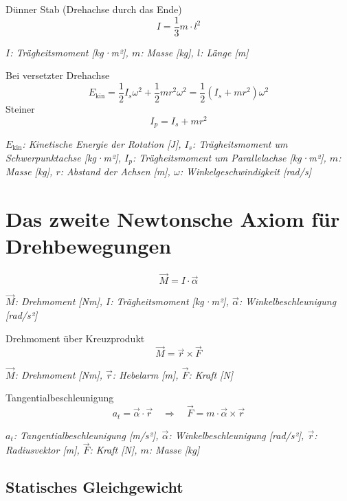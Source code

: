 \documentclass[a4paper,10pt]{article}
\newenvironment{displayformula}
{
	\begin{framed}
		\color{formulaColor}
	}
	{\end{framed}}
\newcommand{\formulalegend}[1]{%
	\par\vspace{0.5ex}%
	{{\color{legendColor}\RaggedRight\small\textit{#1}}}%
	\par\vspace{1.5ex}%
}
\begin{document}
\begin{displayformula}
	Dünner Stab (Drehachse durch das Ende)
	\[
	I = \frac{1}{3} m \cdot l^2
	\]
\end{displayformula}
\formulalegend{
	\( I \): Trägheitsmoment [kg·m²], \( m \): Masse [kg], \( l \): Länge [m]
}

\begin{displayformula}
	Bei versetzter Drehachse
	\[
	E_{\text{kin}} = \frac{1}{2} I_s \omega^2 + \frac{1}{2} m r^2 \omega^2 = \frac{1}{2} (I_s + m r^2) \omega^2
	\]
	Steiner
	\[
	I_p = I_s + m r^2
	\]
\end{displayformula}
\formulalegend{
	\( E_{\text{kin}} \): Kinetische Energie der Rotation [J], \( I_s \): Trägheitsmoment um Schwerpunktachse [kg·m²], \( I_p \): Trägheitsmoment um Parallelachse [kg·m²], \( m \): Masse [kg], \( r \): Abstand der Achsen [m], \( \omega \): Winkelgeschwindigkeit [rad/s]
}

\section{Das zweite Newtonsche Axiom für Drehbewegungen}

\begin{displayformula}
	\[
	\vec{M} = I \cdot \vec{\alpha}
	\]
\end{displayformula}
\formulalegend{
	\( \vec{M} \): Drehmoment [Nm], \( I \): Trägheitsmoment [kg·m²], \( \vec{\alpha} \): Winkelbeschleunigung [rad/s²]
}

\begin{displayformula}
	Drehmoment über Kreuzprodukt
	\[
	\vec{M} = \vec{r} \times \vec{F}
	\]
\end{displayformula}
\formulalegend{
	\( \vec{M} \): Drehmoment [Nm], \( \vec{r} \): Hebelarm [m], \( \vec{F} \): Kraft [N]
}

\begin{displayformula}
	Tangentialbeschleunigung
	\[
	a_t = \vec{\alpha} \cdot \vec{r} \quad \Rightarrow \quad \vec{F} = m \cdot \vec{\alpha} \times \vec{r}
	\]
\end{displayformula}
\formulalegend{
	\( a_t \): Tangentialbeschleunigung [m/s²], \( \vec{\alpha} \): Winkelbeschleunigung [rad/s²], \( \vec{r} \): Radiusvektor [m], \( \vec{F} \): Kraft [N], \( m \): Masse [kg]
}

\subsection{Statisches Gleichgewicht}
\end{document}
